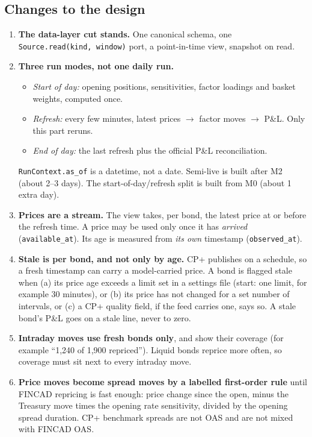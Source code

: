 \documentclass[11pt,a4paper]{article}
\newcommand{\code}[1]{\texttt{\small #1}}
\begin{document}
\subsection{Changes to the design}
\begin{enumerate}
\item \textbf{The data-layer cut stands.} One canonical schema, one \code{Source.read(kind, window)} port, a point-in-time view, snapshot on read.
\item \textbf{Three run modes, not one daily run.}
  \begin{itemize}
  \item \emph{Start of day:} opening positions, sensitivities, factor loadings and basket weights, computed once.
  \item \emph{Refresh:} every few minutes, latest prices $\to$ factor moves $\to$ P\&L. Only this part reruns.
  \item \emph{End of day:} the last refresh plus the official P\&L reconciliation.
  \end{itemize}
  \code{RunContext.as\_of} is a datetime, not a date. Semi-live is built after M2 (about 2--3 days). The start-of-day/refresh split is built from M0 (about 1 extra day).
\item \textbf{Prices are a stream.} The view takes, per bond, the latest price at or before the refresh time. A price may be used only once it has \emph{arrived} (\code{available\_at}). Its age is measured from \emph{its own} timestamp (\code{observed\_at}).
\item \textbf{Stale is per bond, and not only by age.} CP+ publishes on a schedule, so a fresh timestamp can carry a model-carried price. A bond is flagged stale when (a) its price age exceeds a limit set in a settings file (start: one limit, for example 30 minutes), or (b) its price has not changed for a set number of intervals, or (c) a CP+ quality field, if the feed carries one, says so. A stale bond's P\&L goes on a stale line, never to zero.
\item \textbf{Intraday moves use fresh bonds only}, and show their coverage (for example ``1,240 of 1,900 repriced''). Liquid bonds reprice more often, so coverage must sit next to every intraday move.
\item \textbf{Price moves become spread moves by a labelled first-order rule} until FINCAD repricing is fast enough: price change since the open, minus the Treasury move times the opening rate sensitivity, divided by the opening spread duration. CP+ benchmark spreads are not OAS and are not mixed with FINCAD OAS.

\end{enumerate}
\end{document}
